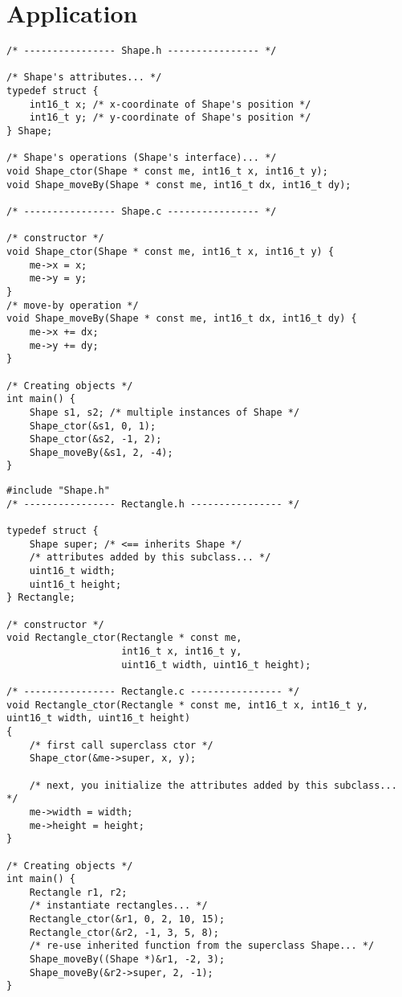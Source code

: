 \chapter{Application}
\label{chap:application}

\begin{lstlisting}[caption={Class declaration in C}, label={lst:C_class_decl}]
/* ---------------- Shape.h ---------------- */

/* Shape's attributes... */ 
typedef struct {
    int16_t x; /* x-coordinate of Shape's position */
    int16_t y; /* y-coordinate of Shape's position */ 
} Shape;

/* Shape's operations (Shape's interface)... */
void Shape_ctor(Shape * const me, int16_t x, int16_t y); 
void Shape_moveBy(Shape * const me, int16_t dx, int16_t dy);

/* ---------------- Shape.c ---------------- */

/* constructor */
void Shape_ctor(Shape * const me, int16_t x, int16_t y) {
    me->x = x;
    me->y = y; 
}
/* move-by operation */
void Shape_moveBy(Shape * const me, int16_t dx, int16_t dy) {
    me->x += dx;
    me->y += dy; 
}

/* Creating objects */ 
int main() {
    Shape s1, s2; /* multiple instances of Shape */
    Shape_ctor(&s1, 0, 1);
    Shape_ctor(&s2, -1, 2); 
    Shape_moveBy(&s1, 2, -4);
}
\end{lstlisting}

\begin{lstlisting}[caption={Inheritance in C}, label=lst:C_inheritance]
#include "Shape.h"
/* ---------------- Rectangle.h ---------------- */

typedef struct {
    Shape super; /* <== inherits Shape */ 
    /* attributes added by this subclass... */ 
    uint16_t width;
    uint16_t height;
} Rectangle;

/* constructor */
void Rectangle_ctor(Rectangle * const me, 
                    int16_t x, int16_t y, 
                    uint16_t width, uint16_t height);

/* ---------------- Rectangle.c ---------------- */
void Rectangle_ctor(Rectangle * const me, int16_t x, int16_t y,
uint16_t width, uint16_t height) 
{
    /* first call superclass ctor */
    Shape_ctor(&me->super, x, y);

    /* next, you initialize the attributes added by this subclass... */ 
    me->width = width;
    me->height = height;
}

/* Creating objects */ 
int main() {
    Rectangle r1, r2;
    /* instantiate rectangles... */ 
    Rectangle_ctor(&r1, 0, 2, 10, 15); 
    Rectangle_ctor(&r2, -1, 3, 5, 8);
    /* re-use inherited function from the superclass Shape... */ 
    Shape_moveBy((Shape *)&r1, -2, 3);
    Shape_moveBy(&r2->super, 2, -1);
}
\end{lstlisting}


